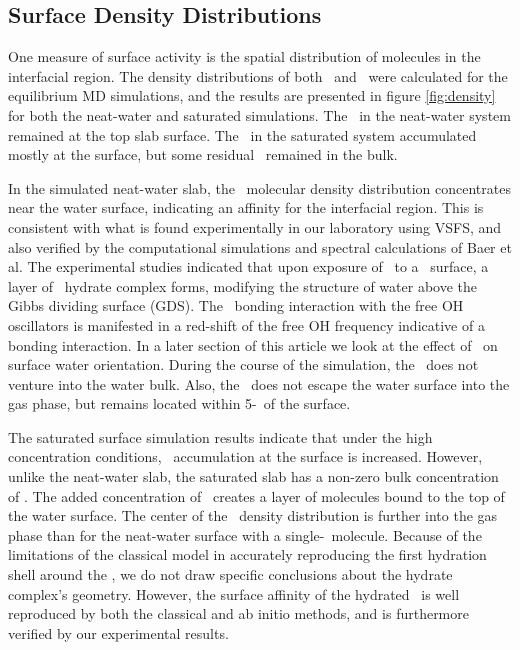 \subsection{Surface Density Distributions}

One measure of surface activity is the spatial distribution of molecules in the interfacial region. The density distributions of both \wat~and \suldiox~were calculated for the equilibrium MD simulations, and the results are presented in figure \ref{fig:density} for both the neat-water and saturated simulations. The \suldiox~in the neat-water system remained at the top slab surface. The \suldiox~in the saturated system accumulated mostly at the surface, but some residual \suldiox~remained in the bulk.



In the simulated neat-water slab, the \suldiox~molecular density distribution concentrates near the water surface, indicating an affinity for the interfacial region. This is consistent with what is found experimentally in our laboratory using VSFS,\cite{Tarbuck2005,Tarbuck2006} and also verified by the computational simulations and spectral calculations of Baer et al.\cite{Baer2010} The experimental studies indicated that upon exposure of \suldiox~to a \wat~surface, a layer of \suldiox~hydrate complex forms, modifying the structure of water above the Gibbs dividing surface (GDS). The \suldiox~bonding interaction with the free OH oscillators is manifested in a red-shift of the free OH frequency indicative of a bonding interaction. In a later section of this article we look at the effect of \suldiox~on surface water orientation.  During the course of the simulation, the \suldiox~does not venture into the water bulk. Also, the \suldiox~does not escape the water surface into the gas phase, but remains located within 5-\angs~of the surface. 

The saturated surface simulation results indicate that under the high concentration conditions, \suldiox~accumulation at the surface is increased. However, unlike the neat-water slab, the saturated slab has a non-zero bulk concentration of \suldiox. The added concentration of \suldiox~creates a layer of molecules bound to the top of the water surface. The center of the \suldiox~density distribution is further into the gas phase than for the neat-water surface with a single-\suldiox~molecule. Because of the limitations of the classical model in accurately reproducing the first hydration shell around the \suldiox,\cite{Baer2010} we do not draw specific conclusions about the hydrate complex's geometry. However, the surface affinity of the hydrated \suldiox~is well reproduced by both the classical and ab initio methods, and is furthermore verified by our experimental results.

